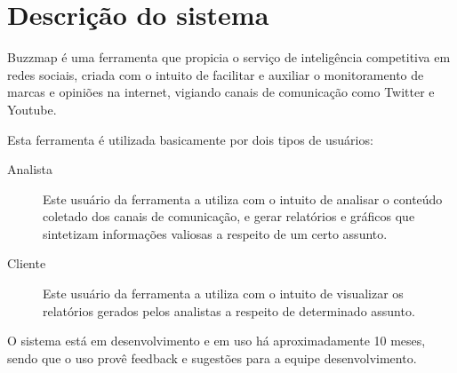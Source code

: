 \chapter{Descrição do sistema}
Buzzmap é uma ferramenta que propicia o serviço de inteligência
competitiva em redes sociais, criada com o intuito de facilitar e
auxiliar o monitoramento de marcas e opiniões na internet, vigiando
canais de comunicação como Twitter e Youtube.

Esta ferramenta é utilizada basicamente por dois tipos de usuários:
\begin{description}
    \item[Analista] Este usuário da ferramenta a utiliza com o intuito
    de analisar o conteúdo coletado dos canais de comunicação, e gerar
    relatórios e gráficos que sintetizam informações valiosas a
    respeito de um certo assunto.

    \item[Cliente] Este usuário da ferramenta a utiliza com o intuito
    de visualizar os relatórios gerados pelos analistas a respeito de
    determinado assunto.
\end{description}

O sistema está em desenvolvimento e em uso há aproximadamente 10 meses,
sendo que o uso provê feedback e sugestões para a equipe
desenvolvimento.
